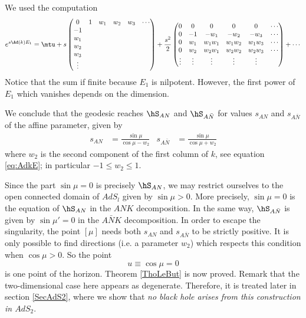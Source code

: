 We used the computation
\[
  e^{s\Ad(k)E_1}=\mtu+s
\begin{pmatrix}
0&1&w_1&w_2&w_3&\cdots\\
-1\\w_1\\w_2\\w_3\\\vdots
\end{pmatrix}
+\frac{s^2}{2}
\begin{pmatrix}
0&0&0&0&0&\cdots\\
0&-1&-w_1&-w_2&-w_3&\cdots\\
0&w_1&w_1w_1&w_1w_2&w_1w_3&\cdots\\
0&w_2&w_2w_1&w_2w_2&w_2w_3&\cdots\\
\vdots&\vdots&\vdots&\vdots&\vdots
\end{pmatrix}
+\cdots
\]
Notice that the sum if finite because $E_1$ is nilpotent. However, the first power of $E_1$ which vanishes depends on the dimension.

We conclude that the geodesic reaches $\hS_{AN}$ and $\hS_{A\bar{N}}$ for values $s_{AN}$ and $s_{A\bar{N}}$ of the affine parameter, given by
\begin{align}   \label{eq:tempssingul}
 s_{AN}&= \frac{\sin\mu}{\cos\mu - w_2}&s_{A\bar{N}}&= \frac{\sin\mu}{\cos\mu + w_2}
\end{align}
where $w_{2}$ is the second component of the first column of $k$, see equation \eqref{eq:AdkE}; in particular $-1\leq w_2 \leq 1$.

Since the part $\sin \mu =0$ is precisely  $\hS_{AN}$, we may restrict ourselves to the open connected domain of $AdS_l$ given by $\sin \mu > 0$. More precisely, $\sin\mu=0$ is the equation of $\hS_{AN}$ in the $ANK$ decomposition. In the same way, $\hS_{A\bar{N}}$ is given by $\sin\mu'=0$ in the $A\bar{N}K$ decomposition.  In order to escape the singularity, the point $[\mu]$ needs both $s_{AN}$ and $s_{A\bar{N}}$ to be strictly positive.  It is only possible to find directions (i.e. a parameter $w_2$) which respects this condition when $\cos \mu>0$.  So the point
\begin{equation}  \label{EqUnPtHoriz}
u\equiv \cos\mu=0
\end{equation}
is one point of the horizon. Theorem \ref{ThoLeBut} is now proved. Remark that the two-dimensional case here appears as degenerate. Therefore, it is treated later in section \ref{SecAdS2}, where we show that \emph{no black hole arises from this construction in $AdS_2$}.

